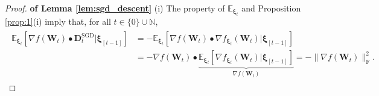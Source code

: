 \documentclass[twoside,11pt]{article}
\begin{document}
\begin{proof}
\textbf{of Lemma \ref{lem:sgd_descent}} (i) The property of $\mathbb{E}_{\bm{\xi}_t}$ and Proposition \ref{prop:1}(i) imply that, for all $t \in \{0\} \cup \mathbb{N}$, 
\begin{align}\label{eq:1}
\begin{split}
\mathbb{E}_{\bm{\xi}_t} \left[\nabla f (\bm{W}_t) \bullet \bm{D}_t^{\mathrm{SGD}}|\bm{\xi}_{[t-1]} \right]
&= - \mathbb{E}_{\bm{\xi}_t} \left[\nabla f (\bm{W}_t) \bullet \nabla f_{\bm{\xi}_t} (\bm{W}_t) |\bm{\xi}_{[t-1]} \right]\\ 
&= - \nabla f (\bm{W}_t) \bullet 
\underbrace{\mathbb{E}_{\bm{\xi}_t} \left[ \nabla f_{\bm{\xi}_t} (\bm{W}_t) |\bm{\xi}_{[t-1]} \right]}_{\nabla f (\bm{W}_t)} 
= - \|\nabla f (\bm{W}_t)\|_{\mathrm{F}}^2.
\end{split}
\end{align}


\end{proof}
\end{document}
